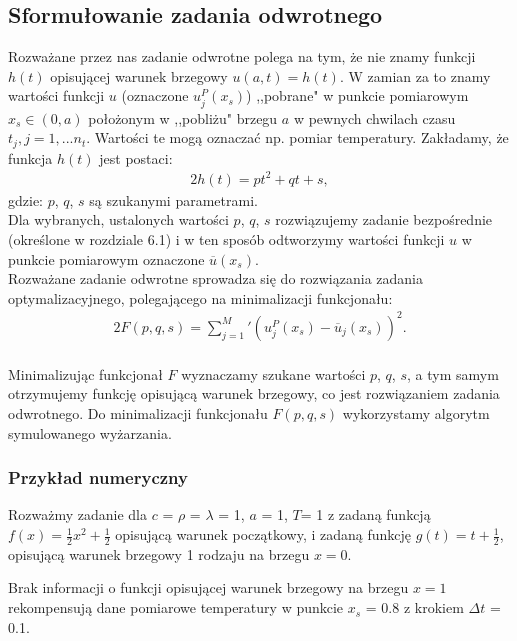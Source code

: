\documentclass[twoside]{projektInzynierskiMS1}
\newcommand{\si}{ś}
\begin{document}
\subsection{Sformułowanie zadania odwrotnego}

Rozważane przez nas zadanie odwrotne polega na tym, że nie znamy funkcji $h(t)$ opisującej warunek brzegowy $u(a, t) = h(t)$.
W zamian za to znamy wartości funkcji $u$ (oznaczone $u^P_j(x_s)$) ,,pobrane" w punkcie pomiarowym $x_s \in (0, a)$
położonym w ,,pobliżu" brzegu $a$ w pewnych chwilach czasu $t_j, j = 1, ... n_t$. Wartości te mogą oznaczać np. pomiar temperatury.
Zakładamy, że funkcja $h(t)$ jest postaci: \\
\begin{alignat*}{2}
h(t) = pt^2 +qt  + s,
\end{alignat*}
gdzie: $p$, $q$, $s$ są szukanymi parametrami. \\

Dla wybranych, ustalonych wartości $p$, $q$, $s$ rozwiązujemy zadanie bezpośrednie (okre\si lone w rozdziale 6.1) i w ten sposób odtworzymy wartości funkcji $u$ w punkcie pomiarowym oznaczone $\overline u (x_s)$. \\


Rozważane zadanie odwrotne sprowadza się do rozwiązania zadania optymalizacyjnego, polegającego na minimalizacji funkcjonału:
\begin{alignat*}{2}
F(p, q, s) = \sum_{j=1}^M\prime \left(u^P_j (x_s) - \overline u_j (x_s)\right)^2.\\
\end{alignat*}

Minimalizując funkcjonał $F$ wyznaczamy szukane wartości $p$, $q$, $s$, a tym samym otrzymujemy funkcję opisującą warunek brzegowy, co jest rozwiązaniem zadania odwrotnego.
Do minimalizacji funkcjonału $F(p, q, s)$ wykorzystamy algorytm symulowanego wyżarzania. \\

\subsubsection{Przykład numeryczny}

Rozważmy zadanie dla $c$ = $\rho$ = $\lambda$ = 1, $a$ = 1, $T$= 1 z zadaną funkcją $f(x) =  \frac{1}{2} x^2 + \frac{1}{2}$ opisującą warunek początkowy, i zadaną funkcję $g(t) = t + \frac{1}{2}$, opisującą warunek brzegowy 1 rodzaju na brzegu $x = 0$.

Brak informacji o funkcji opisującej warunek brzegowy na brzegu $x = 1$ rekompensują dane pomiarowe temperatury w punkcie $x_s$ = 0.8 z krokiem $\Delta t$ = 0.1.
\end{document}
